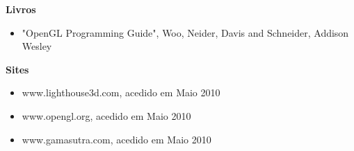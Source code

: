 \textbf{Livros}
\begin{itemize}
\item{"OpenGL Programming Guide", Woo, Neider, Davis and Schneider, Addison Wesley}
\end{itemize}


\textbf{Sites}
\begin{itemize}
\item{www.lighthouse3d.com, acedido em Maio 2010}
\item{www.opengl.org, acedido em Maio 2010}
\item{www.gamasutra.com, acedido em Maio 2010}
\end{itemize}
